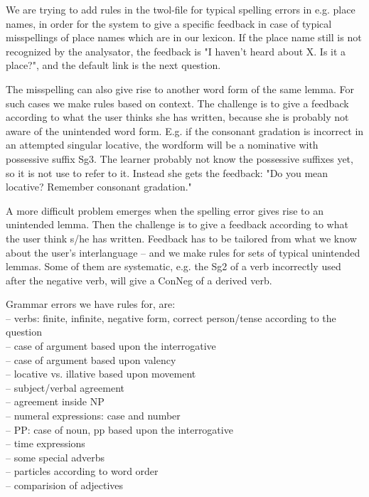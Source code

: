 \documentclass[11pt]{article}
\begin{document}
We are trying to add rules in the twol-file for typical spelling errors in e.g. place names, in order for the system to give a specific feedback in case of typical misspellings of place names which are in our lexicon. If the place name still is not recognized by the analysator, the feedback is "I haven’t heard about X. Is it a 
place?", and the default link is the next question.

The misspelling can also give rise to another word form of the same lemma. For such cases we make rules based on context. The challenge is to give a feedback according to what the user thinks she has written, because she is probably not aware of the unintended word form. E.g. if the consonant gradation is incorrect in an attempted singular locative, the wordform will be a nominative with possessive suffix Sg3. The learner probably not know the possessive suffixes yet, so it is not use to refer to it. Instead she gets the feedback: "Do you mean locative? Remember consonant gradation." 

A more difficult problem emerges when the spelling error gives rise to an unintended lemma. Then the challenge is to give a feedback according to what the user think s/he has written. Feedback has to be tailored from what we know about the user’s interlanguage – and we make rules for sets of typical unintended lemmas. Some of them are systematic, e.g. the Sg2 of a verb incorrectly used after the negative verb, will give a ConNeg of a derived verb.  

Grammar errors we have rules for, are:\\
-- verbs: finite, infinite, negative form, correct person/tense according to the question\\
-- case of argument based upon the interrogative \\
-- case of argument based upon valency\\
-- locative vs. illative based upon movement\\
-- subject/verbal agreement\\
-- agreement inside NP \\
-- numeral expressions: case and number  \\
-- PP: case of noun, pp based upon the interrogative \\ 
-- time expressions \\
-- some special adverbs  \\
-- particles according to word order \\
-- comparision of adjectives\\
\end{document}

